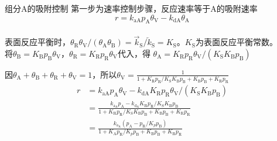 \begin{frame}{组分A的吸附控制}
    第一步为速率控制步骤，反应速率等于A的吸附速率
    $$r=k_\mathrm{aA}p_\mathrm{A}\theta_\mathrm{V}-k_\mathrm{dA}\theta_\mathrm{A}$$
    \\表面反应平衡时，$\theta_{\mathrm{R}} \theta_{\mathrm{V}} /(\theta_{\mathrm{A}} \theta_{\mathrm{B}})=\vec{k}_{\mathrm{S}} / \overleftarrow{k}_{\mathrm{S}}=K_{\mathrm{S}}$。$K_{\mathrm{S}}$为表面反应平衡常数。
    \\将$\theta_{\mathrm{B}}=K_\mathrm{B}p_\mathrm{B}\theta_\mathrm{V}$，$\theta_\mathrm{R}= K_\mathrm{R}p_\mathrm{R}\theta_\mathrm{V}$代入，得
    $\theta_{\mathrm{A}}=K_{\mathrm{R}} p_{\mathrm{R}} \theta_{\mathrm{V}} /(K_{\mathrm{S}} K_{\mathrm{B}} p_{\mathrm{B}})$

    因$\theta_\mathrm{A}+\theta_\mathrm{B}+\theta_\mathrm{R}+\theta_\mathrm{V}=1$，所以$\theta_\mathrm{V}=\frac{1}{1+K_\mathrm{R}p_\mathrm{R}/K_\mathrm{S}K_\mathrm{B}p_\mathrm{B}+K_\mathrm{B}p_\mathrm{B}+K_\mathrm{R}p_\mathrm{R}}$
    \[
        \begin{aligned}
            r&=k_{\mathrm{aA}} p_{\mathrm{A}} \theta_{\mathrm{V}}-k_{\mathrm{dA}} K_{\mathrm{R}} p_{\mathrm{R}} \theta_{\mathrm{V}} /(K_{\mathrm{S}} K_{\mathrm{B}} p_{\mathrm{B}}) \\
            &= \frac{k_{\mathrm{a}_{\mathrm{A}}} p_{\mathrm{A}}-k_{\mathrm{d}_{\mathrm{A}}} K_{\mathrm{R}} p_{\mathrm{R}} / K_{\mathrm{S}} K_{\mathrm{B}} p_{\mathrm{B}}}{1+K_{\mathrm{R}} p_{\mathrm{R}} / K_{\mathrm{S}} K_{\mathrm{B}} p_{\mathrm{B}}+K_{\mathrm{B}} p_{\mathrm{B}}+K_{\mathrm{R}} p_{\mathrm{R}}}\\
            &=\frac{k_{\mathrm{a}_{\mathrm{A}}}(p_{\mathrm{A}}-p_{\mathrm{R}} / K_{p} p_{\mathrm{B}})}{1+K_{\mathrm{A}} p_{\mathrm{R}} / K_{p} p_{\mathrm{B}}+K_{\mathrm{B}} p_{\mathrm{B}}+K_{\mathrm{R}} p_{\mathrm{R}}}
        \end{aligned}
    \]
\end{frame}


